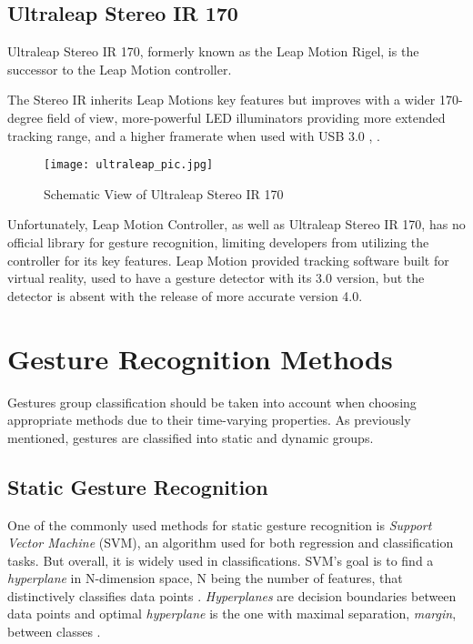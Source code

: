 \subsection{Ultraleap Stereo IR 170}

Ultraleap Stereo IR 170, formerly known as the Leap Motion Rigel, is the successor to the Leap Motion controller.

The Stereo IR inherits Leap Motions key features but improves with a wider 170-degree field of view, more-powerful LED illuminators providing more extended tracking range, and a higher framerate when used with USB 3.0 \cite{ultraleap}, \cite{ultraleap2}.

\begin{figure}[H]
	\centering
    \texttt{[image: ultraleap\_pic.jpg]}
	\caption{Schematic View of Ultraleap Stereo IR 170 \cite{ultraleap}}
	\label{fig:lmcScheme}
\end{figure}

Unfortunately, Leap Motion Controller, as well as Ultraleap Stereo IR 170, has no official library for gesture recognition, limiting developers from utilizing the controller for its key features. Leap Motion provided tracking software built for virtual reality, used to have a gesture detector with its 3.0 version, but the detector is absent with the release of more accurate version 4.0.


\section{Gesture Recognition Methods
}

Gestures group classification should be taken into account when choosing appropriate methods due to their time-varying properties. As previously mentioned, gestures are classified into static and dynamic groups. 

\subsection{Static Gesture Recognition}

One of the commonly used methods for static gesture recognition is \textit{Support Vector Machine} (SVM), an algorithm used for both regression and classification tasks. But overall, it is widely used in classifications. SVM's goal is to find a \textit{hyperplane} in N-dimension space, N being the number of features, that distinctively classifies data points \cite{svmIntroToML}. \textit{Hyperplanes} are decision boundaries between data points and optimal \textit{hyperplane} is the one with maximal separation, \textit{margin}, between classes \cite{savaris}.

